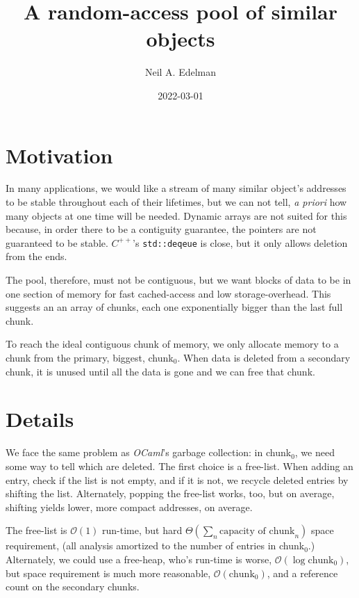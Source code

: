\documentclass[12pt]{article}
\author{Neil A. Edelman}
\title{A random-access pool of similar objects}
\date{2022-03-01}
\newcommand{\code}[1]{\colorbox{light-gray}{\texttt{#1}}}
\begin{document}
\maketitle


\section{Motivation}

In many applications, we would like a stream of many similar object's addresses to be stable throughout each of their lifetimes, but we can not tell, {\it a priori} how many objects at one time will be needed. Dynamic arrays are not suited for this because, in order there to be a contiguity guarantee, the pointers are not guaranteed to be stable. $C^{++}$'s \code{std::deqeue} is close, but it only allows deletion from the ends.

The pool, therefore, must not be contiguous, but we want blocks of data to be in one section of memory for fast cached-access and low storage-overhead. This suggests an an array of chunks, each one exponentially bigger than the last full chunk.

To reach the ideal contiguous chunk of memory, we only allocate memory to a chunk from the primary, biggest, chunk$_0$. When data is deleted from a secondary chunk, it is unused until all the data is gone and we can free that chunk.

\section{Details}

We face the same problem as {\it OCaml}'s garbage collection: in chunk$_0$, we need some way to tell which are deleted. The first choice is a free-list. When adding an entry, check if the list is not empty, and if it is not, we recycle deleted entries by shifting the list. Alternately, popping the free-list works, too, but on average, shifting yields lower, more compact addresses, on average.

The free-list is $\mathcal{O}(1)$ run-time, but hard $\Theta(\sum_n\text{capacity of chunk}_n)$\cite{knuth1976big} space requirement, (all analysis amortized to the number of entries in chunk$_0$.) Alternately, we could use a free-heap, who's run-time is worse, $\mathcal{O}(\log \text{chunk}_0)$, but space requirement is much more reasonable, $\mathcal{O}(\text{chunk}_0)$, and a reference count on the secondary chunks.
\end{document}
